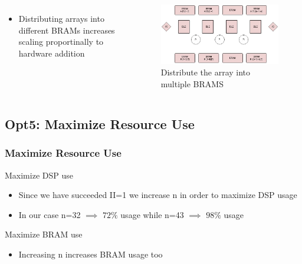 \documentclass{beamer}
\begin{document}
\begin{frame}
\begin{columns}[c]
\end{columns}

\begin{columns}[c]


\begin{itemize}
\item Distributing arrays into different BRAMs increases scaling proportinally to hardware addition
\end{itemize}

\begin{figure}
\includegraphics[width=.6\linewidth,center]{arraysplit.jpg}
\caption{Distribute the array into multiple BRAMS}
\end{figure}

\end{columns}
\end{frame}
\begin{frame}
\subsection{Opt5: Maximize Resource Use}
\frametitle{Maximize Resource Use}

\begin{block}{Maximize DSP use}
\end{block}
\begin{itemize}
\item Since we have succeeded II=1 we increase n in order to maximize DSP usage
\item In our case n=32 $\implies$ $72\%$ usage while n=43 $\implies$ $98\%$ usage
\end{itemize}

\begin{block}{Maximize BRAM use}
\begin{itemize}
\item Increasing n increases BRAM usage too
\end{itemize}
\end{block}


\end{frame}
\end{document}
